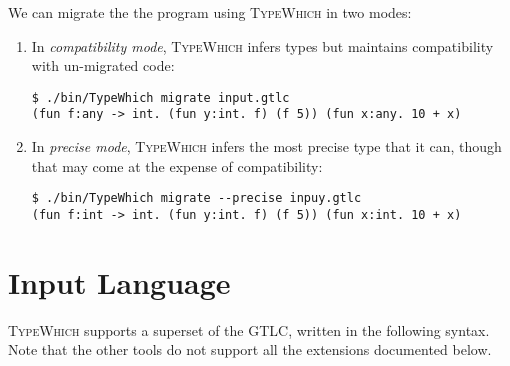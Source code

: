 \documentclass{book}
\newcommand{\system}{\textsc{TypeWhich}\xspace}
\begin{document}
We can migrate the the program using \system in two modes:

\begin{enumerate}

\item In \emph{compatibility mode}, \system infers types but maintains
compatibility with un-migrated code:

\begin{verbatim}
$ ./bin/TypeWhich migrate input.gtlc
(fun f:any -> int. (fun y:int. f) (f 5)) (fun x:any. 10 + x)
\end{verbatim}

\item In \emph{precise mode}, \system infers the most precise type that it
can, though that may come at the expense of compatibility:

\begin{verbatim}
$ ./bin/TypeWhich migrate --precise inpuy.gtlc
(fun f:int -> int. (fun y:int. f) (f 5)) (fun x:int. 10 + x)
\end{verbatim}
     
\end{enumerate}

\section{Input Language}\label{input-lang-gtlc}

\system supports a superset of the GTLC, written in the following syntax. Note
that the other tools do not support all the extensions documented below.
\end{document}
